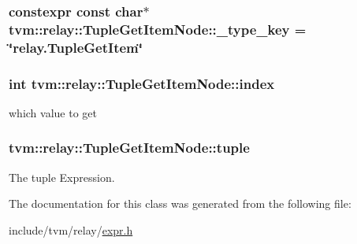 \subsubsection[{\texorpdfstring{\+\_\+type\+\_\+key}{_type_key}}]{\setlength{\rightskip}{0pt plus 5cm}constexpr const char$\ast$ tvm\+::relay\+::\+Tuple\+Get\+Item\+Node\+::\+\_\+type\+\_\+key = \char`\"{}relay.\+Tuple\+Get\+Item\char`\"{}\hspace{0.3cm}{\ttfamily [static]}}\hypertarget{classtvm_1_1relay_1_1TupleGetItemNode_ab961b65dea40152e3e8b1be66a20494e}{}\label{classtvm_1_1relay_1_1TupleGetItemNode_ab961b65dea40152e3e8b1be66a20494e}
\subsubsection[{\texorpdfstring{index}{index}}]{\setlength{\rightskip}{0pt plus 5cm}int tvm\+::relay\+::\+Tuple\+Get\+Item\+Node\+::index}\hypertarget{classtvm_1_1relay_1_1TupleGetItemNode_a72d32db7efcd228f67f27b632cf49cbc}{}\label{classtvm_1_1relay_1_1TupleGetItemNode_a72d32db7efcd228f67f27b632cf49cbc}


which value to get 

\subsubsection[{\texorpdfstring{tuple}{tuple}}]{ tvm\+::relay\+::\+Tuple\+Get\+Item\+Node\+::tuple}\hypertarget{classtvm_1_1relay_1_1TupleGetItemNode_aade4882f84d828975c689b5c6b1b68e6}{}\label{classtvm_1_1relay_1_1TupleGetItemNode_aade4882f84d828975c689b5c6b1b68e6}


The tuple Expression. 



The documentation for this class was generated from the following file\+:\begin{DoxyCompactItemize}
\item 
include/tvm/relay/\hyperlink{relay_2expr_8h}{expr.\+h}\end{DoxyCompactItemize}
